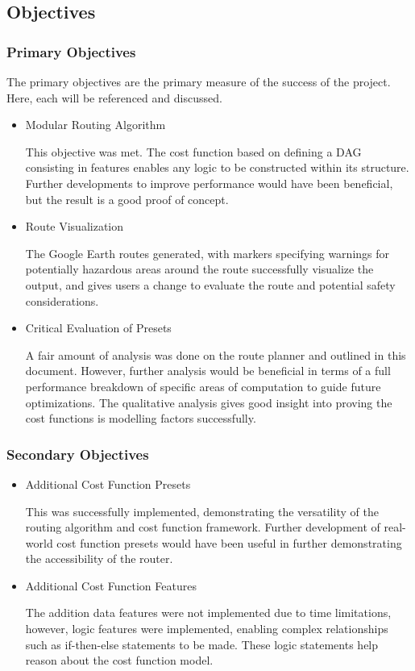\documentclass[12pt]{article}
\begin{document}
\subsection{Objectives}

\subsubsection{Primary Objectives}

The primary objectives are the primary measure of the success of the project. Here, each will be referenced and discussed.

\begin{itemize}
  \item Modular Routing Algorithm

        This objective was met. The cost function based on defining a DAG consisting in features enables any logic to be constructed within its structure. Further developments to improve performance would have been beneficial, but the result is a good proof of concept.

  \item Route Visualization

        The Google Earth routes generated, with markers specifying warnings for potentially hazardous areas around the route successfully visualize the output, and gives users a change to evaluate the route and potential safety considerations.

  \item Critical Evaluation of Presets

        A fair amount of analysis was done on the route planner and outlined in this document. However, further analysis would be beneficial in terms of a full performance breakdown of specific areas of computation to guide future optimizations. The qualitative analysis gives good insight into proving the cost functions is modelling factors successfully.

\end{itemize}

\subsubsection{Secondary Objectives}

\begin{itemize}
  \item Additional Cost Function Presets

        This was successfully implemented, demonstrating the versatility of the routing algorithm and cost function framework. Further development of real-world cost function presets would have been useful in further demonstrating the accessibility of the router.

  \item Additional Cost Function Features

        The addition data features were not implemented due to time limitations, however, logic features were implemented, enabling complex relationships such as if-then-else statements to be made. These logic statements help reason about the cost function model.

\end{itemize}
\end{document}
